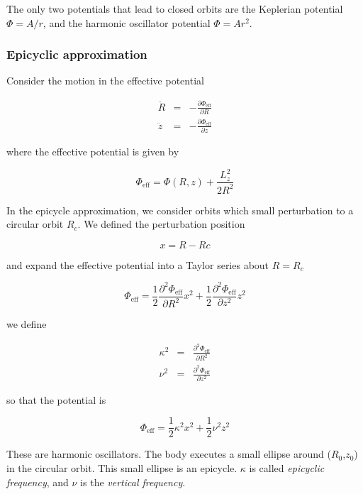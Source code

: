 The only two potentials that lead to closed orbits are the Keplerian potential $\varPhi=A/r$, and the harmonic oscillator potential $\varPhi=Ar^2$. 

\subsubsection{Epicyclic approximation}

Consider the motion in the effective potential


\begin{eqnarray}
\ddot{R} &=& -\frac{\partial \varPhi_\mathrm{eff}}{\partial R}\\
\ddot{z} &=& -\frac{\partial \varPhi_\mathrm{eff}}{\partial z}
\end{eqnarray}

where the effective potential is given by 

\begin{equation}
\varPhi_\mathrm{eff} = \varPhi(R,z) + \frac{L_z^2}{2R^2}
\end{equation}

In the epicycle approximation, we consider orbits which small perturbation to a circular orbit $R_c$. We defined the perturbation position 

\begin{equation}
x = R - Rc
\end{equation}

and expand the effective potential into a Taylor series about $R=R_c$ 


\begin{equation}
\varPhi_\mathrm{eff} = \frac{1}{2}\frac{\partial^2 \varPhi_\mathrm{eff}}{\partial R^2} x^2 + \frac{1}{2}\frac{\partial^2 \varPhi_\mathrm{eff}}{\partial z^2} z^2
\end{equation}


we define 

\begin{eqnarray}
\kappa^2 &=& \frac{\partial^2 \varPhi_\mathrm{eff}}{\partial R^2} \\
\nu^2 &=& \frac{\partial^2 \varPhi_\mathrm{eff}}{\partial z^2} 
\end{eqnarray}

so that the potential is 

\begin{equation}
\varPhi_\mathrm{eff} = \frac{1}{2}\kappa^2 x^2 + \frac{1}{2}\nu^2 z^2
\end{equation}

These are harmonic oscillators. The body executes a small ellipse around ($R_0$,$z_0$) in the circular orbit. This small ellipse is an epicycle. $\kappa$ is called {\it epicyclic  frequency}, and $\nu$ is the {\it vertical frequency}.

